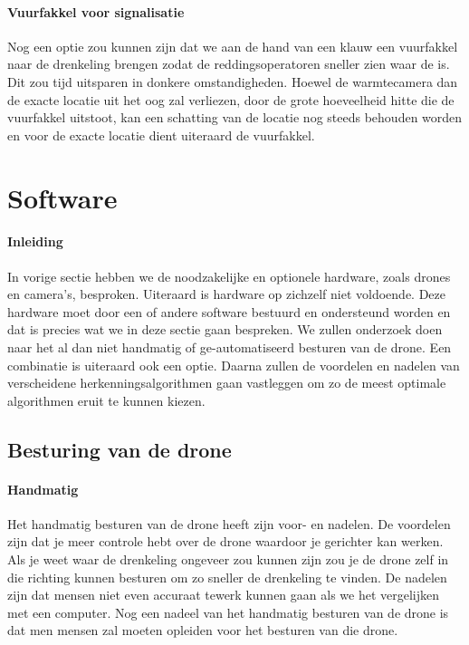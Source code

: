 \paragraph{Vuurfakkel voor signalisatie}

Nog een optie zou kunnen zijn dat we aan de hand van een klauw een vuurfakkel naar de drenkeling brengen zodat de reddingsoperatoren sneller zien waar de is. Dit zou tijd uitsparen in donkere omstandigheden. Hoewel de warmtecamera dan de exacte locatie uit het oog zal verliezen, door de grote hoeveelheid hitte die de vuurfakkel uitstoot, kan een schatting van de locatie nog steeds behouden worden en voor de exacte locatie dient uiteraard de vuurfakkel. 

\section{Software}

\paragraph{Inleiding}
In vorige sectie hebben we de noodzakelijke en optionele hardware, zoals drones en camera's, besproken. Uiteraard is hardware op zichzelf niet voldoende. Deze hardware moet door een of andere software bestuurd en ondersteund worden en dat is precies wat we in deze sectie gaan bespreken. We zullen onderzoek doen naar het al dan niet handmatig of ge-automatiseerd besturen van de drone. Een combinatie is uiteraard ook een optie. Daarna zullen de voordelen en nadelen van verscheidene herkenningsalgorithmen gaan vastleggen om zo de meest optimale algorithmen eruit te kunnen kiezen.

\subsection{Besturing van de drone}

\paragraph{Handmatig}

\subitem
Het handmatig besturen van de drone heeft zijn voor- en nadelen. De voordelen zijn dat je meer controle hebt over de drone waardoor je gerichter kan werken. Als je weet waar de drenkeling ongeveer zou kunnen zijn zou je de drone zelf in die richting kunnen besturen om zo sneller de drenkeling te vinden. De nadelen zijn dat mensen niet even accuraat tewerk kunnen gaan als we het vergelijken met een computer. Nog een nadeel van het handmatig besturen van de drone is dat men mensen zal moeten opleiden voor het besturen van die drone. 

